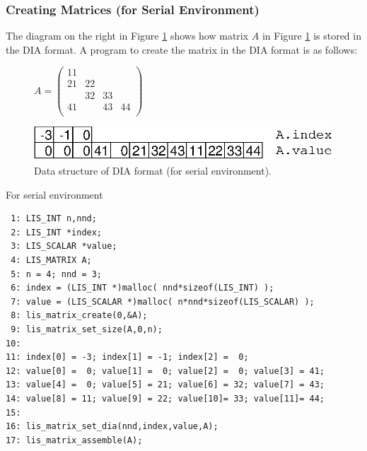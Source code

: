 \documentclass[a4paper]{article}
\begin{document}
\subsubsection{Creating Matrices (for Serial Environment)}
The diagram on the right in Figure \ref{fig:storage04} shows how matrix $A$
in Figure \ref{fig:storage04} is stored in the DIA format. A program to create the matrix in the DIA format is as follows:
\begin{figure}[h]
{\centering 
\begin{minipage}{0.3\textwidth}
\begin{flushright}
$ 
A = \left(
\begin{array}{cccc}
11 &    &    &    \\
21 & 22 &    &    \\
   & 32 & 33 &    \\
41 &    & 43 & 44 \\
\end{array}\right)
$
\end{flushright}
\end{minipage}
\begin{minipage}{0.6\textwidth}
\begin{flushleft}
\includegraphics{storage04.eps} 
\end{flushleft}
\end{minipage}
\caption{Data structure of DIA format (for serial environment).}\label{fig:storage04}}
\end{figure}
\begin{itemsquarebox}[l]{For serial environment}
\small
\begin{verbatim}
 1: LIS_INT n,nnd;
 2: LIS_INT *index;
 3: LIS_SCALAR *value;
 4: LIS_MATRIX A;
 5: n = 4; nnd = 3;
 6: index = (LIS_INT *)malloc( nnd*sizeof(LIS_INT) );
 7: value = (LIS_SCALAR *)malloc( n*nnd*sizeof(LIS_SCALAR) );
 8: lis_matrix_create(0,&A);
 9: lis_matrix_set_size(A,0,n);
10:
11: index[0] = -3; index[1] = -1; index[2] =  0;
12: value[0] =  0; value[1] =  0; value[2] =  0; value[3] = 41;
13: value[4] =  0; value[5] = 21; value[6] = 32; value[7] = 43;
14: value[8] = 11; value[9] = 22; value[10]= 33; value[11]= 44;
15:
16: lis_matrix_set_dia(nnd,index,value,A);
17: lis_matrix_assemble(A);
\end{verbatim}
\end{itemsquarebox}
\end{document}
